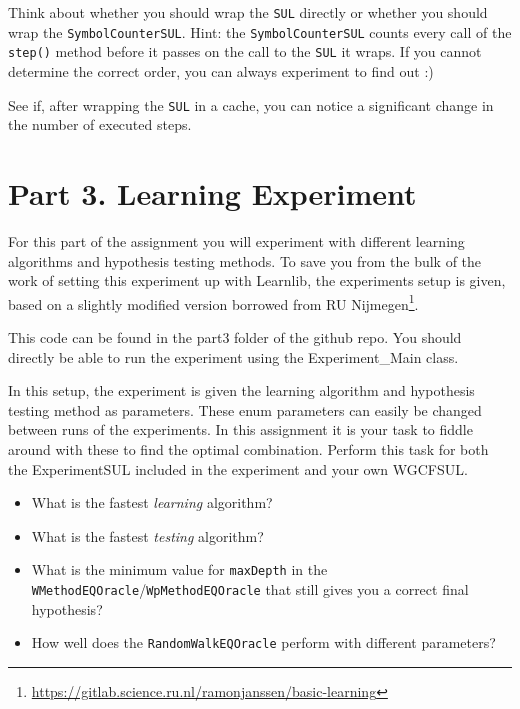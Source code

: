 \documentclass[a4paper]{article}
\begin{document}
Think about whether you should wrap the \texttt{SUL} directly or whether you should wrap the \texttt{SymbolCounterSUL}. Hint: the \texttt{SymbolCounterSUL} counts every call of the \texttt{step()} method before it passes on the call to the \texttt{SUL} it wraps. If you cannot determine the correct order, you can always experiment to find out :)

See if, after wrapping the \texttt{SUL} in a cache, you can notice a significant change in the number of executed steps.

\section*{Part 3. Learning Experiment}
For this part of the assignment you will experiment with different learning algorithms and hypothesis testing methods. To save you from the bulk of the work of setting this experiment up with Learnlib, the experiments setup is given, based on a slightly modified version borrowed from RU Nijmegen\footnote{\url{https://gitlab.science.ru.nl/ramonjanssen/basic-learning}}. 

This code can be found in the part3 folder of the github repo. You should directly be able to run the experiment using the Experiment\_Main class.

In this setup, the experiment is given the learning algorithm and hypothesis testing method as parameters. These enum parameters can easily be changed between runs of the experiments. In this assignment it is your task to fiddle around with these to find the optimal combination. Perform this task for both the ExperimentSUL included in the experiment and your own WGCFSUL. 

\begin{itemize}
     \item What is the fastest \emph{learning} algorithm? 
     \item What is the fastest \emph{testing} algorithm? 
     \item What is the minimum value for \texttt{maxDepth} in the \texttt{WMethodEQOracle}/\texttt{WpMethodEQOracle} that still gives you a correct final hypothesis?
     \item How well does the \texttt{RandomWalkEQOracle} perform with different parameters?
\end{itemize}
\end{document}
